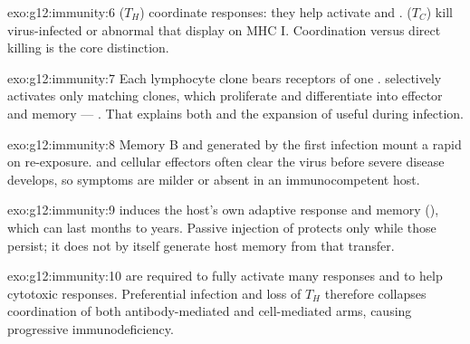 \begin{solution}{exo:g12:immunity:6}
 ($T_H$) coordinate responses: they help activate  and
.  ($T_C$) kill virus-infected or abnormal 
that display  on MHC  I. Coordination versus direct killing is the
core distinction.
\end{solution}

\begin{solution}{exo:g12:immunity:7}
Each lymphocyte clone bears receptors of one .  selectively
activates only matching clones, which proliferate and differentiate into
effector and memory  --- . That explains both 
and the expansion of useful  during infection.
\end{solution}

\begin{solution}{exo:g12:immunity:8}
Memory B and  generated by the first infection mount a rapid  on re-exposure.  and cellular effectors often clear the virus
before severe disease develops, so symptoms are milder or absent in an
immunocompetent host.
\end{solution}

\begin{solution}{exo:g12:immunity:9}
 induces the host's own adaptive response and memory (), which can last months to years. Passive injection of 
protects only while those  persist; it does not by itself generate
host memory from that transfer.
\end{solution}

\begin{solution}{exo:g12:immunity:10}
 are required to fully activate many  responses and to
help cytotoxic  responses. Preferential infection and loss of $T_H$
 therefore collapses coordination of both antibody-mediated and
cell-mediated arms, causing progressive immunodeficiency.
\end{solution}

